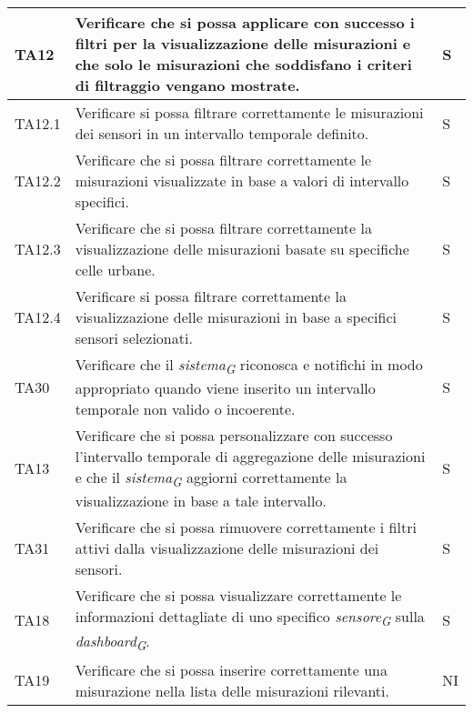 \begin{longtable}{|C{1.9cm}|L{7cm}|C{2cm}|}
    TA12 & Verificare che si possa applicare con successo i filtri per la visualizzazione delle misurazioni e che solo le misurazioni che soddisfano i criteri di filtraggio vengano mostrate. & S \\
    \hline
    
    TA12.1 & Verificare si possa filtrare correttamente le misurazioni dei sensori in un intervallo temporale definito. & S \\
    \hline
    
    TA12.2 & Verificare che si possa filtrare correttamente le misurazioni visualizzate in base a valori di intervallo specifici. & S \\
    \hline
    
    TA12.3 & Verificare che si possa filtrare correttamente la visualizzazione delle misurazioni basate su specifiche celle urbane. & S \\
    \hline
    
    TA12.4 & Verificare si possa filtrare correttamente la visualizzazione delle misurazioni in base a specifici sensori selezionati. & S \\
    \hline
    
    TA30 & Verificare che il \textit{sistema}\textsubscript{\textit{G}} riconosca e notifichi in modo appropriato quando viene inserito un intervallo temporale non valido o incoerente. & S \\
    \hline
    
    TA13 & Verificare che si possa personalizzare con successo l'intervallo temporale di aggregazione delle misurazioni e che il \textit{sistema}\textsubscript{\textit{G}} aggiorni correttamente la visualizzazione in base a tale intervallo. & S \\
    \hline
    
    TA31 & Verificare che si possa rimuovere correttamente i filtri attivi dalla visualizzazione delle misurazioni dei sensori. & S \\
    \hline
    
    TA18 & Verificare che si possa visualizzare correttamente le informazioni dettagliate di uno specifico \textit{sensore}\textsubscript{\textit{G}} sulla \textit{dashboard}\textsubscript{\textit{G}}. & S \\
    \hline
    
    TA19 & Verificare che si possa inserire correttamente una misurazione nella lista delle misurazioni rilevanti. & NI \\
    \hline
    

\end{longtable}
